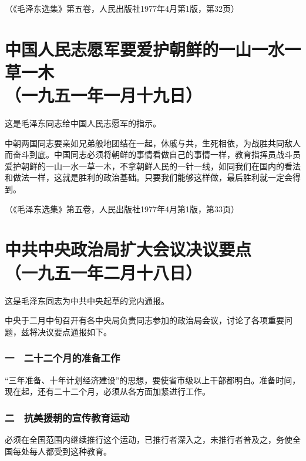 \documentclass[cn,11pt,chinese]{elegantbook}
\def\myformat#1{\hfil\hfil #1}
\begin{document}
\begin{flushright}（《毛泽东选集》第五卷，人民出版社1977年4月第1版，第32页）\end{flushright}
\newpage\section*{\myformat{中国人民志愿军要爱护朝鲜的一山一水一草一木}\\\myformat{（一九五一年一月十九日）}}
\begin{introduction}\item  这是毛泽东同志给中国人民志愿军的指示。\end{introduction}
中朝两国同志要亲如兄弟般地团结在一起，休戚与共，生死相依，为战胜共同敌人而奋斗到底。中国同志必须将朝鲜的事情看做自己的事情一样，教育指挥员战斗员爱护朝鲜的一山一水一草一木，不拿朝鲜人民的一针一线，如同我们在国内的看法和做法一样，这就是胜利的政治基础。只要我们能够这样做，最后胜利就一定会得到。\\
\begin{flushright}（《毛泽东选集》第五卷，人民出版社1977年4月第1版，第33页）\end{flushright}
\newpage\section*{\myformat{中共中央政治局扩大会议决议要点}\\\myformat{（一九五一年二月十八日）}}
\begin{introduction}\item  这是毛泽东同志为中共中央起草的党内通报。\end{introduction}
中央于二月中旬召开有各中央局负责同志参加的政治局会议，讨论了各项重要问题，兹将决议要点通报如下。\\
\subsubsection*{\myformat{一　二十二个月的准备工作}}
“三年准备、十年计划经济建设”的思想，要使省市级以上干部都明白。准备时间，现在起，还有二十二个月，必须从各方面加紧进行工作。\\
\subsubsection*{\myformat{二　抗美援朝的宣传教育运动}}
必须在全国范围内继续推行这个运动，已推行者深入之，未推行者普及之，务使全国每处每人都受到这种教育。\\
\end{document}
